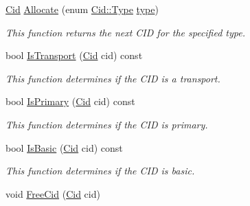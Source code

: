 \begin{DoxyCompactItemize}
\hyperlink{classns3_1_1Cid}{Cid} \hyperlink{classns3_1_1CidFactory_a59d1440e0e9018066f91dce413db209c}{Allocate} (enum \hyperlink{classns3_1_1Cid_a10b8f92080ca5790e65a0bfa2f557e0a}{Cid\+::\+Type} \hyperlink{visualizer-ideas_8txt_add98db9e15e2a58cf2b57623e7aa893a}{type})
\begin{DoxyCompactList}\small\item\em This function returns the next C\+ID for the specified type. \end{DoxyCompactList}\item 
bool \hyperlink{classns3_1_1CidFactory_a0963e7b59774db4fb70956414f1a08f4}{Is\+Transport} (\hyperlink{classns3_1_1Cid}{Cid} cid) const 
\begin{DoxyCompactList}\small\item\em This function determines if the C\+ID is a transport. \end{DoxyCompactList}\item 
bool \hyperlink{classns3_1_1CidFactory_a9ce2f9de01ae4bf9d782e043eef025db}{Is\+Primary} (\hyperlink{classns3_1_1Cid}{Cid} cid) const 
\begin{DoxyCompactList}\small\item\em This function determines if the C\+ID is primary. \end{DoxyCompactList}\item 
bool \hyperlink{classns3_1_1CidFactory_a7d70ebd7630a8414ce3eefb7580bdc57}{Is\+Basic} (\hyperlink{classns3_1_1Cid}{Cid} cid) const 
\begin{DoxyCompactList}\small\item\em This function determines if the C\+ID is basic. \end{DoxyCompactList}\item 
void \hyperlink{classns3_1_1CidFactory_af6d359632ff2bf72d15ace0d8a94b478}{Free\+Cid} (\hyperlink{classns3_1_1Cid}{Cid} cid)
\end{DoxyCompactItemize}
